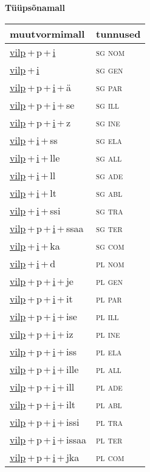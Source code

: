 
\vspace{1.8em}
\begin{minipage}{\textwidth}
\textbf{Tüüpsõnamall \,}\\

\begin{sideways}
\begin{tabular}{l l}
muutvormimall & tunnused \\
\hline
\underline{vilp}\,+\,p\,+\,\underline{i} & \textsc{ sg nom } \\
\underline{vilp}\,+\,\underline{i} & \textsc{ sg gen } \\
\underline{vilp}\,+\,p\,+\,\underline{i}\,+\,ä & \textsc{ sg par } \\
\underline{vilp}\,+\,p\,+\,\underline{i}\,+\,se & \textsc{ sg ill } \\
\underline{vilp}\,+\,p\,+\,\underline{i}\,+\,z & \textsc{ sg ine } \\
\underline{vilp}\,+\,\underline{i}\,+\,ss & \textsc{ sg ela } \\
\underline{vilp}\,+\,\underline{i}\,+\,lle & \textsc{ sg all } \\
\underline{vilp}\,+\,\underline{i}\,+\,ll & \textsc{ sg ade } \\
\underline{vilp}\,+\,\underline{i}\,+\,lt & \textsc{ sg abl } \\
\underline{vilp}\,+\,\underline{i}\,+\,ssi & \textsc{ sg tra } \\
\underline{vilp}\,+\,p\,+\,\underline{i}\,+\,ssaa & \textsc{ sg ter } \\
\underline{vilp}\,+\,\underline{i}\,+\,ka & \textsc{ sg com } \\
\underline{vilp}\,+\,\underline{i}\,+\,d & \textsc{ pl nom } \\
\underline{vilp}\,+\,p\,+\,\underline{i}\,+\,je & \textsc{ pl gen } \\
\underline{vilp}\,+\,p\,+\,\underline{i}\,+\,it & \textsc{ pl par } \\
\underline{vilp}\,+\,p\,+\,\underline{i}\,+\,ise & \textsc{ pl ill } \\
\underline{vilp}\,+\,p\,+\,\underline{i}\,+\,iz & \textsc{ pl ine } \\
\underline{vilp}\,+\,p\,+\,\underline{i}\,+\,iss & \textsc{ pl ela } \\
\underline{vilp}\,+\,p\,+\,\underline{i}\,+\,ille & \textsc{ pl all } \\
\underline{vilp}\,+\,p\,+\,\underline{i}\,+\,ill & \textsc{ pl ade } \\
\underline{vilp}\,+\,p\,+\,\underline{i}\,+\,ilt & \textsc{ pl abl } \\
\underline{vilp}\,+\,p\,+\,\underline{i}\,+\,issi & \textsc{ pl tra } \\
\underline{vilp}\,+\,p\,+\,\underline{i}\,+\,issaa & \textsc{ pl ter } \\
\underline{vilp}\,+\,p\,+\,\underline{i}\,+\,jka & \textsc{ pl com } \\
\end{tabular}
\end{sideways}
\label{tab:tüüpsõnamall-vilppi}


\end{minipage}

